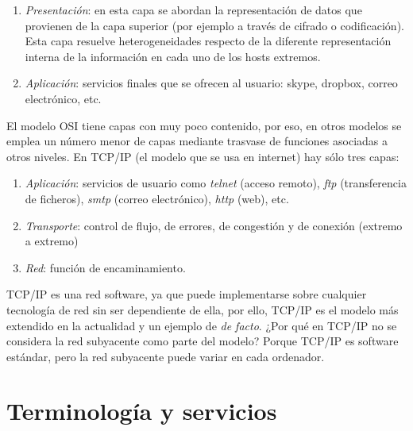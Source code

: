 \documentclass[10pt,a4paper,spanish]{report}
\begin{document}
\begin{enumerate}[\color{tema1}{$\bigstar$}]
  \item \textit{\textcolor{tema1}{Presentación}}: en esta capa se abordan la representación de datos que provienen de la capa superior (por ejemplo a través de cifrado o codificación). Esta capa resuelve heterogeneidades respecto de la diferente representación interna de la información en cada uno de los hosts extremos.

  \item \textit{\textcolor{tema1}{Aplicación}}: servicios finales que se ofrecen al usuario: skype, dropbox, correo electrónico, etc.
\end{enumerate}

El modelo OSI tiene capas con muy poco contenido, por eso, en otros modelos se emplea un número menor de capas mediante trasvase de funciones asociadas a otros niveles. En TCP/IP (el modelo que se usa en internet) hay sólo tres capas:

\begin{enumerate}[\color{tema1}{$\bigstar$}]
  \item \textit{\textcolor{tema1}{Aplicación}}: servicios de usuario como \textit{\textcolor{tema1}{telnet}} (acceso remoto), \textit{\textcolor{tema1}{ftp}} (transferencia de ficheros), \textit{\textcolor{tema1}{smtp}} (correo electrónico), \textit{\textcolor{tema1}{http}} (web), etc.
  \item \textit{\textcolor{tema1}{Transporte}}: control de flujo, de errores, de congestión y de conexión (extremo a extremo)
  \item \textit{\textcolor{tema1}{Red}}: función de encaminamiento.
\end{enumerate}

TCP/IP es una red software, ya que puede implementarse sobre cualquier tecnología de red sin ser dependiente de ella, por ello, TCP/IP es el modelo más extendido en la actualidad y un ejemplo de \textit{\textcolor{tema1}{de facto}}. ¿Por qué en TCP/IP no se considera la red subyacente como parte del modelo? Porque TCP/IP es software estándar, pero la red subyacente puede variar en cada ordenador.%


\newpage
\section{\textcolor{tema1}Terminología y servicios}
\begin{center}

\label{comosi}
\end{center}
\end{document}
